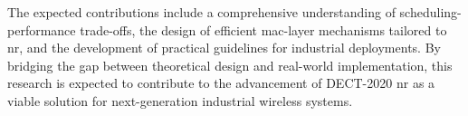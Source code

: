 \documentclass[12pt,a4paper]{article}
\begin{document}
The expected contributions include a comprehensive understanding of scheduling-performance trade-offs, the design of efficient \gls{mac}-layer mechanisms tailored to \gls{nr}, and the development of practical guidelines for industrial deployments. By bridging the gap between theoretical design and real-world implementation, this research is expected to contribute to the advancement of DECT-2020 \gls{nr} as a viable solution for next-generation industrial wireless systems.






%

\end{document}
